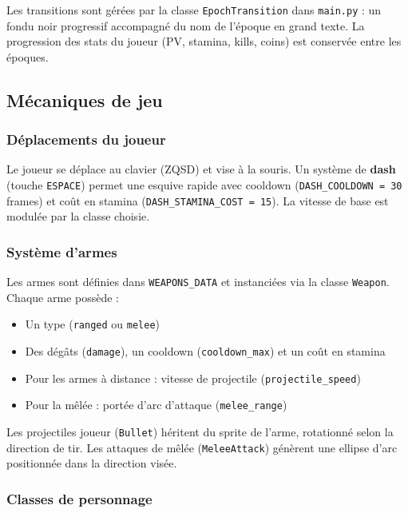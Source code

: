 \documentclass[12pt,a4paper]{article}
\begin{document}
Les transitions sont gérées par la classe \texttt{EpochTransition} dans \texttt{main.py} : un fondu noir progressif accompagné du nom de l'époque en grand texte. La progression des stats du joueur (PV, stamina, kills, coins) est conservée entre les époques.

\subsection{Mécaniques de jeu}

\subsubsection*{Déplacements du joueur}

Le joueur se déplace au clavier (ZQSD) et vise à la souris. Un système de \textbf{dash} (touche \texttt{ESPACE}) permet une esquive rapide avec cooldown (\texttt{DASH\_COOLDOWN = 30} frames) et coût en stamina (\texttt{DASH\_STAMINA\_COST = 15}). La vitesse de base est modulée par la classe choisie.

\subsubsection*{Système d'armes}

Les armes sont définies dans \texttt{WEAPONS\_DATA} et instanciées via la classe \texttt{Weapon}. Chaque arme possède :
\begin{itemize}[noitemsep, leftmargin=1.5em]
  \item Un type (\texttt{ranged} ou \texttt{melee})
  \item Des dégâts (\texttt{damage}), un cooldown (\texttt{cooldown\_max}) et un coût en stamina
  \item Pour les armes à distance : vitesse de projectile (\texttt{projectile\_speed})
  \item Pour la mêlée : portée d'arc d'attaque (\texttt{melee\_range})
\end{itemize}

Les projectiles joueur (\texttt{Bullet}) héritent du sprite de l'arme, rotationné selon la direction de tir. Les attaques de mêlée (\texttt{MeleeAttack}) génèrent une ellipse d'arc positionnée dans la direction visée.

\subsubsection*{Classes de personnage}
\end{document}

